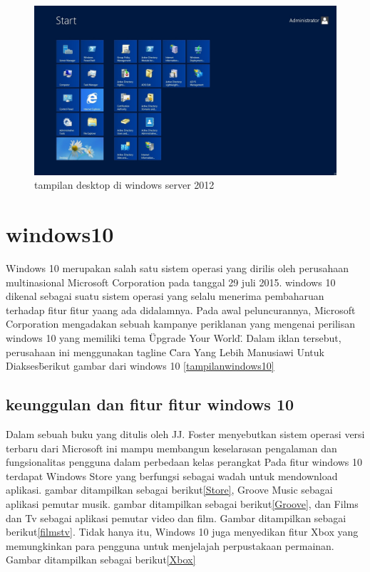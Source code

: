 \begin{figure}[ht]
\centerline{\includegraphics[width=1\textwidth]{figures/windows12.JPG}}
\caption{tampilan desktop di windows server 2012}
\label{windows12}
\end{figure}

	
	\section{windows10}
		Windows 10 merupakan salah satu sistem operasi yang dirilis oleh perusahaan multinasional Microsoft Corporation pada tanggal 29 juli 2015. windows 10 dikenal sebagai suatu sistem 
		operasi yang selalu menerima pembaharuan terhadap fitur fitur yaang ada didalamnya. Pada awal peluncurannya, Microsoft Corporation mengadakan sebuah kampanye periklanan yang 
		mengenai perilisan windows 10 yang memiliki tema \"Upgrade Your World\". Dalam iklan tersebut, perusahaan ini menggunakan tagline \"Cara Yang Lebih Manusiawi Untuk Diakses\" berikut gambar dari windows 10 \ref{tampilanwindows10}
		\subsection{keunggulan dan fitur fitur windows 10}
			Dalam sebuah buku yang ditulis oleh JJ. Foster menyebutkan sistem operasi versi terbaru dari Microsoft ini mampu membangun keselarasan pengalaman dan fungsionalitas pengguna 
			dalam perbedaan kelas perangkat \cite{foster2001data} 
			Pada fitur windows 10 terdapat Windows Store yang berfungsi sebagai wadah untuk mendownload aplikasi. gambar ditampilkan sebagai berikut\ref{Store}, Groove Music sebagai 
			aplikasi pemutar musik. gambar ditampilkan sebagai berikut\ref{Groove}, dan Films dan Tv sebagai aplikasi pemutar video dan film. Gambar ditampilkan sebagai berikut\ref{filmstv}. 
			Tidak hanya itu, Windows 10 juga menyedikan fitur Xbox yang memungkinkan para pengguna untuk menjelajah perpustakaan permainan. Gambar ditampilkan sebagai berikut\ref{Xbox}
